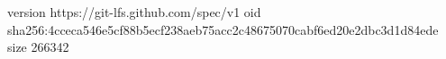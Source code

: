 version https://git-lfs.github.com/spec/v1
oid sha256:4cceca546e5cf88b5ecf238aeb75acc2c48675070cabf6ed20e2dbc3d1d84ede
size 266342
